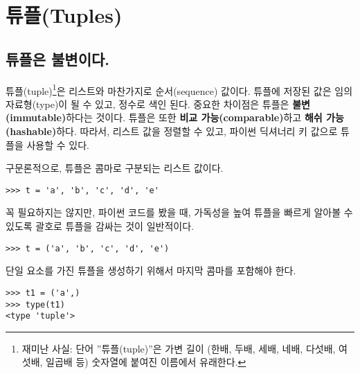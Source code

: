 
\chapter{튜플(Tuples)}
\label{tuplechap}

\section{튜플은 불변이다.}


튜플(tuple)\footnote{재미난 사실: 단어 ''튜플(tuple)''은 가변 길이 (한배, 두배, 세배, 네배, 다섯배, 여섯배, 일곱배 등) 숫자열에 
붙여진 이름에서 유래한다.}은 리스트와 마찬가지로 순서(sequence) 값이다. 
튜플에 저장된 값은 임의 자료형(type)이 될 수 있고, 정수로 색인 된다.
중요한 차이점은 튜플은 {\bf 불변(immutable)}하다는 것이다.
튜플은 또한 {\bf 비교 가능(comparable)}하고 {\bf 해쉬 가능(hashable)}하다.
따라서, 리스트 값을 정렬할 수 있고, 파이썬 딕셔너리 키 값으로 튜플을 사용할 수 있다.


구문론적으로, 튜플은 콤마로 구분되는 리스트 값이다.

\beforeverb
\begin{verbatim}
>>> t = 'a', 'b', 'c', 'd', 'e'
\end{verbatim}
\afterverb
%

꼭 필요하지는 않지만, 파이썬 코드를 봤을 때, 가독성을 높여 튜플을 빠르게 알아볼 수 있도록 괄호로 튜플을 감싸는 것이 일반적이다.


\beforeverb
\begin{verbatim}
>>> t = ('a', 'b', 'c', 'd', 'e')
\end{verbatim}
\afterverb
%

단일 요소를 가진 튜플을 생성하기 위해서 마지막 콤마를 포함해야 한다.


\beforeverb
\begin{verbatim}
>>> t1 = ('a',)
>>> type(t1)
<type 'tuple'>
\end{verbatim}
\afterverb
%


